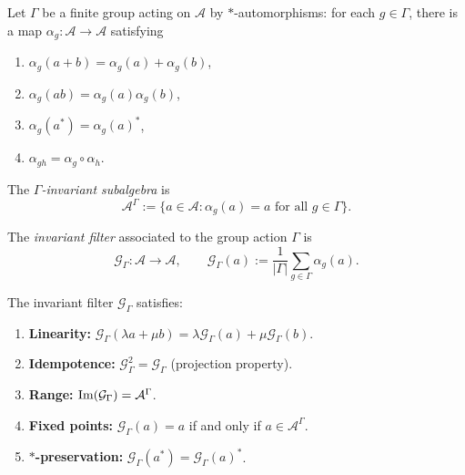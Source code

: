 \begin{definition}
\label{def:invariant-subalgebra}
Let $\Gamma$ be a finite group acting on $\mathcal{A}$ by $*$-automorphisms: for each $g \in \Gamma$, there is a map $\alpha_g: \mathcal{A} \to \mathcal{A}$ satisfying
\begin{enumerate}[label=(\roman*)]
\item $\alpha_g(a + b) = \alpha_g(a) + \alpha_g(b)$,
\item $\alpha_g(ab) = \alpha_g(a)\alpha_g(b)$,
\item $\alpha_g(a^*) = \alpha_g(a)^*$,
\item $\alpha_{gh} = \alpha_g \circ \alpha_h$.
\end{enumerate}
The \emph{$\Gamma$-invariant subalgebra} is
\[
\mathcal{A}^\Gamma := \{ a \in \mathcal{A} : \alpha_g(a) = a \text{ for all } g \in \Gamma \}.
\]
\end{definition}

\begin{definition}
\label{def:invariant-filter}
The \emph{invariant filter} associated to the group action $\Gamma$ is
\[
\mathcal{G}_\Gamma: \mathcal{A} \to \mathcal{A}, \qquad
\mathcal{G}_\Gamma(a) := \frac{1}{|\Gamma|} \sum_{g \in \Gamma} \alpha_g(a).
\]
\end{definition}

\begin{proposition}
\label{prop:invariant-filter-properties}
The invariant filter $\mathcal{G}_\Gamma$ satisfies:
\begin{enumerate}[label=(\roman*)]
\item \textbf{Linearity:} $\mathcal{G}_\Gamma(\lambda a + \mu b) = \lambda \mathcal{G}_\Gamma(a) + \mu \mathcal{G}_\Gamma(b)$.
\item \textbf{Idempotence:} $\mathcal{G}_\Gamma^2 = \mathcal{G}_\Gamma$ (projection property).
\item \textbf{Range:} $\mathrm{Im}(\mathcal{G}_\Gamma) = \mathcal{A}^\Gamma$.
\item \textbf{Fixed points:} $\mathcal{G}_\Gamma(a) = a$ if and only if $a \in \mathcal{A}^\Gamma$.
\item \textbf{$*$-preservation:} $\mathcal{G}_\Gamma(a^*) = \mathcal{G}_\Gamma(a)^*$.
\end{enumerate}
\end{proposition}


